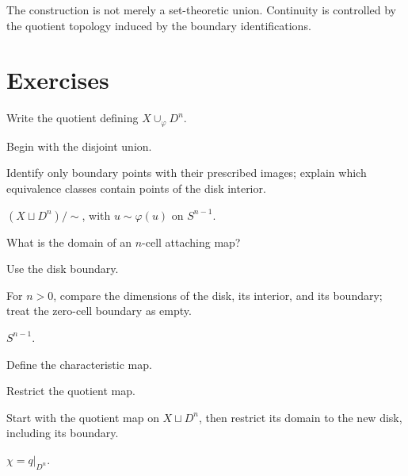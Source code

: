 \begin{warning}\label{warn:viii05-quotient}
The construction is not merely a set-theoretic union.  Continuity is controlled
by the quotient topology induced by the boundary identifications.
\end{warning}


\section{Exercises}

\begin{exercise}\label{exr:viii05-01}
Write the quotient defining \(X\cup_\varphi D^n\).
\end{exercise}
\begin{hint}
Begin with the disjoint union.

Identify only boundary points with their prescribed images; explain which equivalence classes contain points of the disk interior.
\end{hint}
\begin{solution}
\((X\sqcup D^n)/\!\sim\), with \(u\sim\varphi(u)\) on \(S^{n-1}\).
\end{solution}

\begin{exercise}\label{exr:viii05-02}
What is the domain of an \(n\)-cell attaching map?
\end{exercise}
\begin{hint}
Use the disk boundary.

For \(n>0\), compare the dimensions of the disk, its interior, and its boundary; treat the zero-cell boundary as empty.
\end{hint}
\begin{solution}
\(S^{n-1}\).
\end{solution}

\begin{exercise}\label{exr:viii05-03}
Define the characteristic map.
\end{exercise}
\begin{hint}
Restrict the quotient map.

Start with the quotient map on \(X\sqcup D^n\), then restrict its domain to the new disk, including its boundary.
\end{hint}
\begin{solution}
\(\chi=q|_{D^n}\).
\end{solution}

